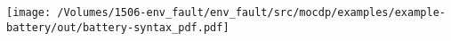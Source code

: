 
    \texttt{[image: /Volumes/1506-env\_fault/env\_fault/src/mocdp/examples/example-battery/out/battery-syntax\_pdf.pdf]}
    
